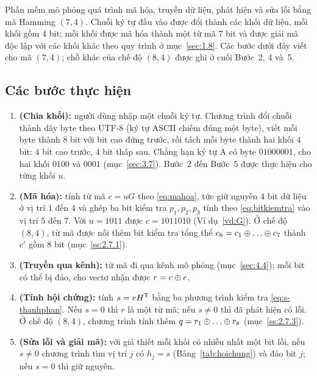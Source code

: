 Phần mềm mô phỏng quá trình mã hóa, truyền dữ liệu, phát hiện và sửa lỗi bằng
mã Hamming $(7,4)$. Chuỗi ký tự đầu vào được đổi thành các khối dữ liệu, mỗi
khối gồm $4$ bit; mỗi khối được mã hóa thành một từ mã $7$ bit và được giải mã
độc lập với các khối khác theo quy trình ở mục~\ref{sec:1.8}. Các bước dưới đây
viết cho mã $(7,4)$; chỗ khác của chế độ $(8,4)$ được ghi ở cuối Bước~2, 4
và~5.

\subsection{Các bước thực hiện}
\label{ss:4.1.1}

\begin{enumerate}[label=\textbf{Bước~\arabic*},leftmargin=2.3cm,labelwidth=1.7cm,labelsep=0.6em,align=left]
  \item \textbf{(Chia khối):} người dùng nhập một chuỗi ký tự. Chương trình đổi
        chuỗi thành dãy byte theo UTF-8 (ký tự ASCII chiếm đúng một byte), viết
        mỗi byte thành $8$ bit với bit cao đứng trước, rồi tách mỗi byte thành
        hai khối $4$ bit: $4$ bit cao trước, $4$ bit thấp sau. Chẳng hạn ký tự
        A có byte $01000001$, cho hai khối $0100$ và $0001$
        (mục~\ref{sec:3.7}). Bước~2 đến Bước~5 được thực hiện cho từng khối
        $u$.
  \item \textbf{(Mã hóa):} tính từ mã $c = uG$ theo \eqref{eq:mahoa}, tức giữ
        nguyên $4$ bit dữ liệu ở vị trí $1$ đến $4$ và ghép ba bit kiểm tra
        $p_1, p_2, p_3$ tính theo \eqref{eq:bitkiemtra} vào vị trí $5$ đến
        $7$. Với $u = 1011$ được $c = 1011010$ (Ví dụ~\ref{vd:G}). Ở chế độ
        $(8,4)$, từ mã được nối thêm bit kiểm tra tổng thể
        $c_8 = c_1 \xor \dots \xor c_7$ thành $c'$ gồm $8$ bit
        (mục~\ref{ss:2.7.1}).
  \item \textbf{(Truyền qua kênh):} từ mã đi qua kênh mô phỏng
        (mục~\ref{sec:4.4}); mỗi bit có thể bị đảo, cho vectơ nhận được
        $r = c \oplus e$.
  \item \textbf{(Tính hội chứng):} tính $s = rH^{\mathsf{T}}$ bằng ba phương trình kiểm
        tra \eqref{eq:s-thanhphan}. Nếu $s = 0$ thì $r$ là một từ mã; nếu
        $s \neq 0$ thì đã phát hiện có lỗi. Ở chế độ $(8,4)$, chương trình tính
        thêm $q = r_1 \xor \dots \xor r_8$ (mục~\ref{ss:2.7.3}).
  \item \textbf{(Sửa lỗi và giải mã):} với giả thiết mỗi khối có nhiều nhất
        một bit lỗi, nếu $s \neq 0$ chương trình tìm vị trí $j$ có $h_j = s$
        (Bảng~\ref{tab:hoichung}) và đảo bit $j$; nếu $s = 0$ thì giữ nguyên.

\end{enumerate}
